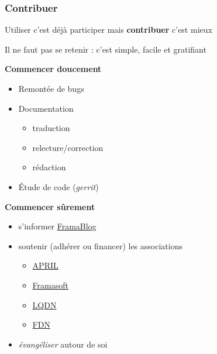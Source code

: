 \documentclass[10pt]{beamer}
\begin{document}
\begin{frame}
  \frametitle{Contribuer}

  \begin{center}
    Utiliser c'est déjà participer mais \textbf{contribuer} c'est mieux

    Il ne faut pas se retenir : c'est simple, facile et gratifiant
  \end{center}
  \vfill

  \textbf{Commencer doucement}
  \begin{itemize}
  \item Remontée de bugs
  \item Documentation
    \begin{itemize}
    \item traduction
    \item relecture/correction
    \item rédaction
    \end{itemize}
  \item Étude de code (\emph{gerrit})
  \end{itemize}

  \textbf{Commencer sûrement}
  \begin{itemize}
  \item s'informer \href{http://www.framablog.org}{FramaBlog}
  \item soutenir (adhérer ou financer) les associations
    \begin{itemize}
    \item \href{http://www.april.org}{APRIL}
    \item \href{http://www.framasoft.net}{Framasoft}
    \item \href{http://www.laquadrature.net/fr}{LQDN}
    \item \href{http://www.fdn.fr}{FDN}
    \end{itemize}
  \item \emph{évangéliser} autour de soi
  \end{itemize}
\end{frame}

\end{document}
